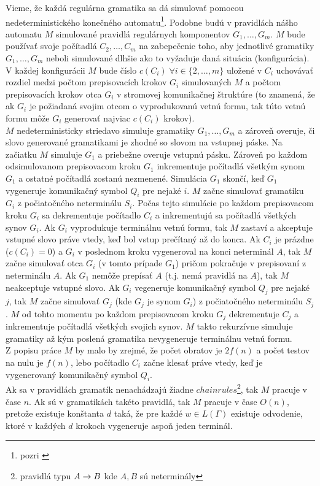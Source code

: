 \begin{dokaz}
  Vieme, že každá regulárna gramatika sa dá simulovať pomocou
  nedeterministického konečného automatu\footnote{pozri
  \cite{Hopc}}. Podobne budú v pravidlách nášho automatu $M$
  simulované pravidlá regulárnych komponentov $G_1,\dots ,G_m$. $M$
  bude používať svoje počítadlá $C_2,\dots ,C_m$ na zabepečenie
  toho, aby jednotlivé gramatiky $G_1,\dots ,G_m$ neboli simulované
  dlhšie ako to vyžaduje daná situácia (konfigurácia). V každej
  konfigurácii $M$ bude číslo $c(C_i)\; \forall i\in\{2,\dots ,m\}$
  uložené v $C_i$ uchovávať rozdiel medzi počtom prepisovacích
  krokov $G_i$ simulovaných $M$ a počtom prepisovacích krokov otca
  $G_i$ v stromovej komunikačnej štruktúre (to znamená, že ak $G_i$
  je požiadaná svojim otcom o vyprodukovanú vetnú formu, tak túto
  vetnú formu môže $G_i$ generovať najviac $c(C_i)$ krokov).
  \\ $M$ nedeterministicky striedavo simuluje gramatiky $G_1,\dots ,G_m$ a
  zároveň overuje, či slovo ge\-ne\-ro\-va\-né gramatikami je zhodné
  so slovom na vstupnej páske. Na začiatku $M$ simuluje $G_1$ a
  priebežne overuje vstupnú pásku. Zároveň po každom odsimulovanom
  prepisovacom kroku $G_1$ inkrementuje počítadlá všetkým synom
  $G_1$ a ostatné počítadlá zostanú nezmenené. Simulácia $G_1$
  skončí, keď $G_1$ vygeneruje komunikačný symbol $Q_i$ pre nejaké
  $i$. $M$ začne simulovať gramatiku $G_i$ z počiatočného
  neterminálu $S_i$. Počas tejto simulácie po každom prepisovacom
  kroku $G_i$ sa dekrementuje počítadlo $C_i$ a inkrementujú sa
  počítadlá všetkých sy\-nov $G_i$. Ak $G_i$ vyprodukuje terminálnu
  vetnú formu, tak $M$ zastaví a akceptuje vstupné slovo práve
  vtedy, keď bol vstup prečítaný až do konca. Ak $C_i$ je prázdne
  ($c(C_i)=0$) a $G_i$ v poslednom kroku vygeneroval na konci
  neterminál $A$, tak $M$ začne simulovať otca $G_i$ (v tomto
  prípade $G_1$) pričom pokračuje v prepisovaní z neterminálu $A$.
  Ak $G_1$ nemôže prepísať $A$ (t.j. nemá pravidlá na $A$), tak $M$
  neakceptuje vstupné slovo. Ak $G_i$ vegeneruje komunikačný symbol
  $Q_j$ pre nejaké $j$, tak $M$ začne simulovať $G_j$ (kde $G_j$ je
  synom $G_i$) z počiatočného neterminálu $S_j$. $M$ od tohto
  momentu po každom prepisovacom kroku $G_j$ dekrementuje $C_j$ a
  inkrementuje počítadlá všetkých svojich synov. $M$ takto
  rekurzívne simuluje gramatiky až kým poslená gramatika
  nevygeneruje terminálnu vetnú formu. \\ Z popisu práce $M$ by malo
  by zrejmé, že počet obratov je $2f(n)$ a počet testov na nulu je
  $f(n)$, lebo počítadlo $C_i$ začne klesať práve vtedy, keď je
  vygenerovaný komunikačný symbol $Q_i$. \\ Ak sa v pravidlách
  gramatík nenachádzajú žiadne $chain rules$\footnote{pravidlá typu
  $A\rightarrow B$ kde $A,B$ sú neterminály}, tak $M$ pracuje v čase $n$. Ak
  sú v gramatikách takéto pravidlá, tak $M$ pracuje v čase $O(n)$,
  pretože existuje konštanta $d$ taká, že pre každé $w\in L(\Gamma)$
  existuje odvodenie, ktoré v každých $d$ krokoch vygeneruje aspoň
  jeden terminál.
\end{dokaz}

